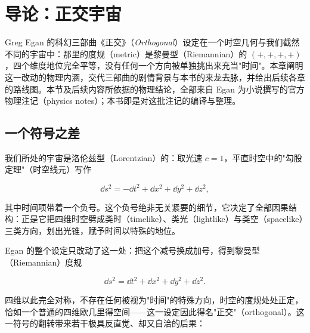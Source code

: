 \chapter{导论：正交宇宙}

Greg Egan 的科幻三部曲《正交》（\emph{Orthogonal}）设定在一个时空几何与我们截然不同的宇宙中：那里的度规（metric）是黎曼型（Riemannian）的 $(+,+,+,+)$，四个维度地位完全平等，没有任何一个方向被单独挑出来充当"时间"。本章阐明这一改动的物理内涵，交代三部曲的剧情背景与本书的来龙去脉，并给出后续各章的路线图。本节及后续内容所依据的物理结论，全部来自 Egan 为小说撰写的官方物理注记（physics notes）；本书即是对这批注记的编译与整理。


\section{一个符号之差}

我们所处的宇宙是洛伦兹型（Lorentzian）的：取光速 $c=1$，平直时空中的"勾股定理"（时空线元）写作

\begin{equation}
\dd s^2 = -\dd t^2 + \dd x^2 + \dd y^2 + \dd z^2 ,
\tag{0.1}
\end{equation}

其中时间项带着一个负号。这个负号绝非无关紧要的细节，它决定了全部因果结构：正是它把四维时空劈成类时（timelike）、类光（lightlike）与类空（spacelike）三类方向，划出光锥，赋予时间以特殊的地位。

Egan 的整个设定只改动了这一处：把这个减号换成加号，得到黎曼型（Riemannian）度规

\begin{equation}
\dd s^2 = \dd t^2 + \dd x^2 + \dd y^2 + \dd z^2 .
\tag{0.2}
\end{equation}

四维以此完全对称，不存在任何被视为"时间"的特殊方向，时空的度规处处正定，恰如一个普通的四维欧几里得空间——这一设定因此得名"正交"（orthogonal）。这一符号的翻转带来若干极具反直觉、却又自洽的后果：

